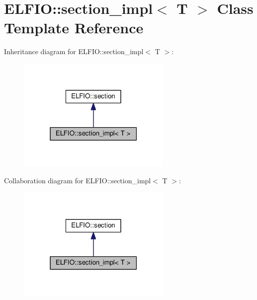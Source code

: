 \hypertarget{class_e_l_f_i_o_1_1section__impl}{}\section{E\+L\+F\+IO\+:\+:section\+\_\+impl$<$ T $>$ Class Template Reference}
\label{class_e_l_f_i_o_1_1section__impl}


Inheritance diagram for E\+L\+F\+IO\+:\+:section\+\_\+impl$<$ T $>$\+:\nopagebreak
\begin{figure}[H]
\begin{center}
\leavevmode
\includegraphics[width=210pt]{class_e_l_f_i_o_1_1section__impl__inherit__graph}
\end{center}
\end{figure}


Collaboration diagram for E\+L\+F\+IO\+:\+:section\+\_\+impl$<$ T $>$\+:\nopagebreak
\begin{figure}[H]
\begin{center}
\leavevmode
\includegraphics[width=210pt]{class_e_l_f_i_o_1_1section__impl__coll__graph}
\end{center}
\end{figure}
